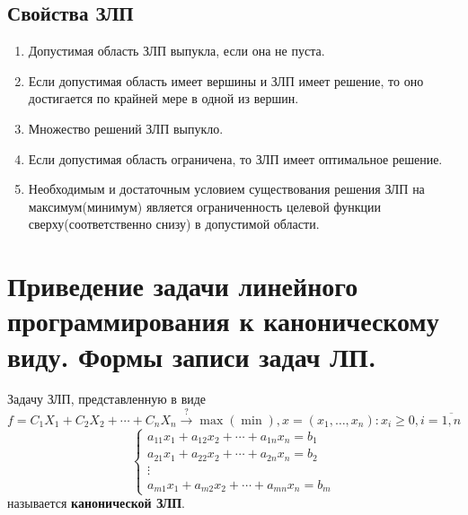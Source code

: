 \documentclass[17pt]{extarticle}
\begin{document}
\subsection{Свойства ЗЛП}
\begin{enumerate}
    \item Допустимая область ЗЛП выпукла, если она не пуста.
    \item Если допустимая область имеет вершины и ЗЛП имеет решение, то оно достигается по крайней мере в одной из вершин.
    \item Множество решений ЗЛП выпукло.
    \item Если допустимая область ограничена, то ЗЛП имеет оптимальное решение.
    \item Необходимым и достаточным условием существования решения ЗЛП на максимум(минимум) является
          ограниченность целевой функции сверху(соответственно снизу) в допустимой области.
\end{enumerate}



\section{Приведение задачи линейного программирования к каноническому виду. Формы записи задач ЛП.}
\begin{definition}
    Задачу ЗЛП, представленную в виде
    \(
    f = C_1 X_1 + C_2 X_2 + \cdots + C_n X_n \xrightarrow{?} \max(\min), x = (x_1, \ldots, x_n) \colon x_i \geq 0, i=\overline{1,n} \)
    \[
        \begin{cases}
            a_{11}x_1 + a_{12}x_2 + \cdots + a_{1n}x_n = b_1 \\
            a_{21}x_1 + a_{22}x_2 + \cdots + a_{2n}x_n = b_2 \\
            \vdots                                           \\
            a_{m1}x_1 + a_{m2}x_2 + \cdots + a_{mn}x_n = b_m
        \end{cases}
    \]
    называется \textbf{канонической ЗЛП}.
\end{definition}
\end{document}
